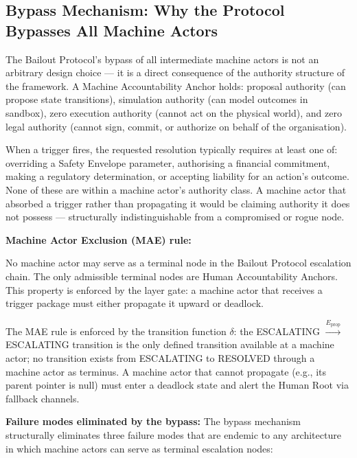 \subsection{Bypass Mechanism: Why the Protocol Bypasses All Machine Actors}
\label{sec:bailout-bypass}

The Bailout Protocol's bypass of all intermediate machine actors is not an
arbitrary design choice — it is a direct consequence of the authority
structure of the \bxthree{} framework. A Machine Accountability Anchor holds:
proposal authority (can propose state transitions), simulation authority (can
model outcomes in sandbox), zero execution authority (cannot act on the
physical world), and zero legal authority (cannot sign, commit, or authorize
on behalf of the organisation).

When a trigger fires, the requested resolution typically requires at least one
of: overriding a Safety Envelope parameter, authorising a financial
commitment, making a regulatory determination, or accepting liability for an
action's outcome. None of these are within a machine actor's authority
class. A machine actor that absorbed a trigger rather than propagating it
would be claiming authority it does not possess — structurally
indistinguishable from a compromised or rogue node.

\bigskip
\noindent\textbf{Machine Actor Exclusion (MAE) rule:}
\begin{invariant}[MAE]
  No machine actor may serve as a terminal node in the Bailout Protocol
  escalation chain. The only admissible terminal nodes are Human
  Accountability Anchors. This property is enforced by the \fact{} layer
  gate: a machine actor that receives a trigger package must either
  propagate it upward or deadlock.
\end{invariant}

The MAE rule is enforced by the transition function $\delta$:
the ESCALATING $\xrightarrow{E_{\text{prop}}}$ ESCALATING transition
is the only defined transition available at a machine actor; no transition
exists from ESCALATING to RESOLVED through a machine actor as terminus.
A machine actor that cannot propagate (e.g., its parent pointer is null)
must enter a deadlock state and alert the Human Root via fallback channels.

\bigskip
\noindent\textbf{Failure modes eliminated by the bypass:} The bypass
mechanism structurally eliminates three failure modes that are endemic to
any architecture in which machine actors can serve as terminal escalation
nodes:

